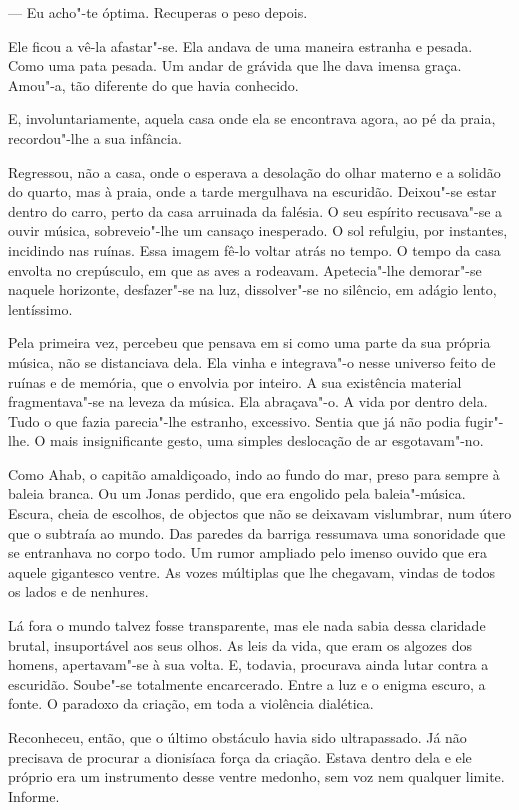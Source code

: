 --- Eu acho"-te óptima. Recuperas o peso depois.

Ele ficou a vê-la afastar"-se. Ela andava de uma maneira estranha e
pesada. Como uma pata pesada. Um andar de grávida que lhe dava imensa
graça. Amou"-a, tão diferente do que havia conhecido.

E, involuntariamente, aquela casa onde ela se encontrava agora, ao pé da
praia, recordou"-lhe a sua infância.

Regressou, não a casa, onde o esperava a desolação do olhar materno e a
solidão do quarto, mas à praia, onde a tarde mergulhava na escuridão.
Deixou"-se estar dentro do carro, perto da casa arruinada da falésia. O
seu espírito recusava"-se a ouvir música, sobreveio"-lhe um cansaço
inesperado. O sol refulgiu, por instantes, incidindo nas ruínas. Essa
imagem fê-lo voltar atrás no tempo. O tempo da casa envolta no
crepúsculo, em que as aves a rodeavam. Apetecia"-lhe demorar"-se naquele
horizonte, desfazer"-se na luz, dissolver"-se no silêncio, em adágio
lento, lentíssimo.

Pela primeira vez, percebeu que pensava em si como uma parte da sua
própria música, não se distanciava dela. Ela vinha e integrava"-o nesse
universo feito de ruínas e de memória, que o envolvia por inteiro. A sua
existência material fragmentava"-se na leveza da música. Ela abraçava"-o.
A vida por dentro dela. Tudo o que fazia parecia"-lhe estranho,
excessivo. Sentia que já não podia fugir"-lhe. O mais insignificante
gesto, uma simples deslocação de ar esgotavam"-no.

Como Ahab, o capitão amaldiçoado, indo ao fundo do mar, preso para
sempre à baleia branca. Ou um Jonas perdido, que era engolido pela
baleia"-música. Escura, cheia de escolhos, de objectos que não se
deixavam vislumbrar, num útero que o subtraía ao mundo. Das paredes da
barriga ressumava uma sonoridade que se entranhava no corpo todo. Um
rumor ampliado pelo imenso ouvido que era aquele gigantesco ventre. As
vozes múltiplas que lhe chegavam, vindas de todos os lados e de
nenhures.

Lá fora o mundo talvez fosse transparente, mas ele nada sabia dessa
claridade brutal, insuportável aos seus olhos. As leis da vida, que eram
os algozes dos homens, apertavam"-se à sua volta. E, todavia, procurava
ainda lutar contra a escuridão. Soube"-se totalmente encarcerado. Entre a
luz e o enigma escuro, a fonte. O paradoxo da criação, em toda a
violência dialética.

Reconheceu, então, que o último obstáculo havia sido ultrapassado. Já
não precisava de procurar a dionisíaca força da criação. Estava dentro
dela e ele próprio era um instrumento desse ventre medonho, sem voz nem
qualquer limite. Informe.

